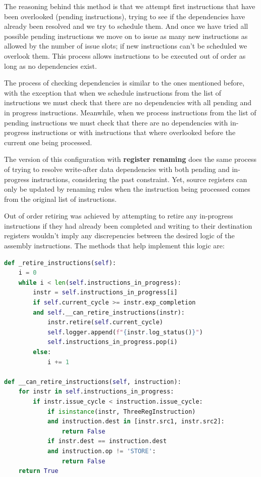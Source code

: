 \documentclass{article}
\begin{document}
The reasoning behind this method is that we attempt first instructions that have been overlooked (pending instructions), trying to see if the dependencies have already been resolved and we try to schedule them. And once we have tried all possible pending instructions we move on to issue as many new instructions as allowed by the number of issue slots; if new instructions can't be scheduled we overlook them. This process allows instructions to be executed out of order as long as no dependencies exist.

The process of checking dependencies is similar to the ones mentioned before, with the exception that when we schedule instructions from the list of instructions we must check that there are no dependencies with all pending and in progress instructions. Meanwhile, when we process instructions from the list of pending instructions we must check that there are no dependencies with in-progress instructions or with instructions that where overlooked before the current one being processed. 

The version of this configuration with \textbf{register renaming} does the same process of trying to resolve write-after data dependencies with both pending and in-progress instructions, considering the past constraint. Yet, source registers can only be updated by renaming rules when the instruction being processed comes from the original list of instructions.

Out of order retiring was achieved by attempting to retire any in-progress instructions if they had already been completed and writing to their destination registers wouldn't imply any discrepencies between the desired logic of the assembly instructions. The methods that help implement this logic are:

\begin{lstlisting}[language=Python]
def _retire_instructions(self):
    i = 0 
    while i < len(self.instructions_in_progress):
        instr = self.instructions_in_progress[i]
        if self.current_cycle >= instr.exp_completion 
        and self.__can_retire_instructions(instr):
            instr.retire(self.current_cycle)
            self.logger.append(f"{instr.log_status()}")
            self.instructions_in_progress.pop(i)
        else:
            i += 1
    
def __can_retire_instructions(self, instruction):
    for instr in self.instructions_in_progress:
        if instr.issue_cycle < instruction.issue_cycle:
            if isinstance(instr, ThreeRegInstruction) 
            and instruction.dest in [instr.src1, instr.src2]:
                return False
            if instr.dest == instruction.dest
            and instruction.op != 'STORE':
                return False
    return True
\end{lstlisting}
\end{document}
